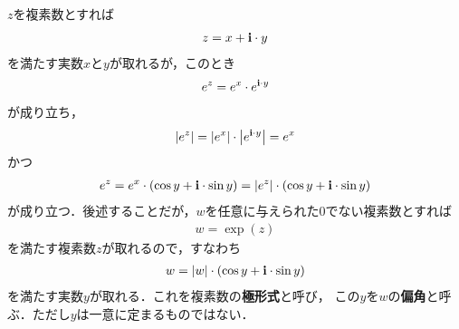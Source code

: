 	$z$を複素数とすれば
	\begin{align}
		z = x + \mathbf{i} \cdot y
	\end{align}
	を満たす実数$x$と$y$が取れるが，このとき
	\begin{align}
		e^z = e^x \cdot e^{\mathbf{i} \cdot y}
	\end{align}
	が成り立ち，
	\begin{align}
		\left|e^z\right| = \left|e^x\right| \cdot \left|e^{\mathbf{i} \cdot y}\right| = e^x
	\end{align}
	かつ
	\begin{align}
		e^z = e^x \cdot (\cos{y} + \mathbf{i} \cdot \sin{y}) = \left|e^z\right| \cdot (\cos{y} + \mathbf{i} \cdot \sin{y})
	\end{align}
	が成り立つ．後述することだが，$w$を任意に与えられた$0$でない複素数とすれば
	\begin{align}
		w = \exp{(z)}
	\end{align}
	を満たす複素数$z$が取れるので，すなわち
	\begin{align}
		w = |w| \cdot (\cos{y} + \mathbf{i} \cdot \sin{y})
	\end{align}
	を満たす実数$y$が取れる．これを複素数の{\bf 極形式}と呼び，
	この$y$を$w$の{\bf 偏角}と呼ぶ．ただし$y$は一意に定まるものではない．
	